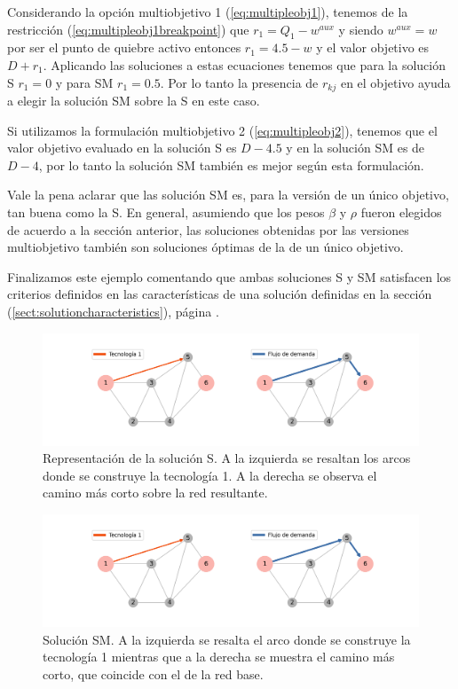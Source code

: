 Considerando la opción multiobjetivo 1 (\ref{eq:multipleobj1}), tenemos de la restricción (\ref{eq:multipleobj1breakpoint}) que $r_1 = Q_1 - w^{aux}$ y siendo $w^{aux} = w$ por ser el punto de quiebre activo entonces $r_1 = 4.5 - w$ y el valor objetivo es $D + r_1$. Aplicando las soluciones a estas ecuaciones tenemos que para la solución S $r_1 = 0$ y para SM $r_1 = 0.5$. Por lo tanto la presencia de $r_{kj}$ en el objetivo ayuda a elegir la solución SM sobre la S en este caso.

Si utilizamos la formulación multiobjetivo 2 (\ref{eq:multipleobj2}), tenemos que el valor objetivo evaluado en la solución S es $D - 4.5$ y en la solución SM es de $D - 4$, por lo tanto la solución SM también es mejor según esta formulación.

Vale la pena aclarar que las solución SM es, para la versión de un único objetivo, tan buena como la S. En general, asumiendo que los pesos $\beta$ y $\rho$ fueron elegidos de acuerdo a la sección anterior, las soluciones obtenidas por las versiones multiobjetivo también son soluciones óptimas de la de un único objetivo.

Finalizamos este ejemplo comentando que ambas soluciones S y SM satisfacen los criterios definidos en las características de una solución definidas en la sección (\ref{sect:solutioncharacteristics}), página \pageref{sect:solutioncharacteristics}.

\begin{figure}[h!]
  \centering
  \includegraphics[width=12cm]{../resources/example_2_sol_v2.png}
  \caption{Representación de la solución S. A la izquierda se resaltan los arcos donde se construye la tecnología 1. A la derecha se observa el camino más corto sobre la red resultante.}
  \label{fig:example2solv2}
\end{figure}

\begin{figure}[h!]
  \centering
  \includegraphics[width=12cm]{../resources/example_2_sol_v1.png}
  \caption{Solución SM. A la izquierda se resalta el arco donde se construye la tecnología 1 mientras que a la derecha se muestra el camino más corto, que coincide con el de la red base.}
  \label{fig:example2solv1}
\end{figure}

